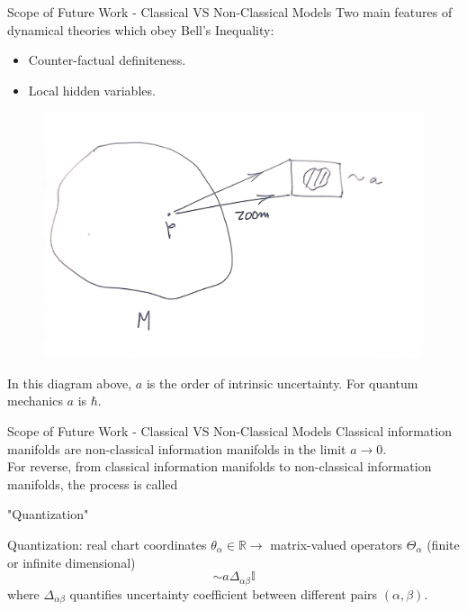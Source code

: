 \documentclass{beamer}
\begin{document}
 \begin{frame}{Scope of Future Work - Classical VS Non-Classical Models}
     Two main features of dynamical theories which obey Bell's Inequality:
     \begin{itemize}
         \item Counter-factual definiteness.
         \item Local hidden variables.
     \end{itemize}
     \begin{figure}
         \centering
         \includegraphics[scale=0.07]{Images/image_10.jpeg}
         \label{fig:fig_5}
     \end{figure}
     In this diagram above, $a$ is the order of intrinsic uncertainty. For quantum mechanics $a$ is $\hbar$. 
 \end{frame}
 \begin{frame}{Scope of Future Work - Classical VS Non-Classical Models}
     Classical information manifolds are non-classical information manifolds in the limit $a\longrightarrow 0$. \\
     For reverse, from classical information manifolds to non-classical information manifolds, the process is called \\
     \vspace{10mm}
     \Large{\centerline{"Quantization"}}
     \vspace{10mm}
     Quantization: real chart coordinates $\theta_{\alpha} \in \mathbb{R}\longrightarrow$ matrix-valued operators $\Theta_{\alpha}$ (finite or infinite dimensional)
     \begin{equation*}
         [\Theta_{\alpha}, \Theta_{\beta}] \sim a\Delta_{\alpha\beta}\mathbb{I}
     \end{equation*} where $\Delta_{\alpha\beta}$ quantifies uncertainty coefficient between different pairs $(\alpha, \beta)$.
 \end{frame}
\end{document}
